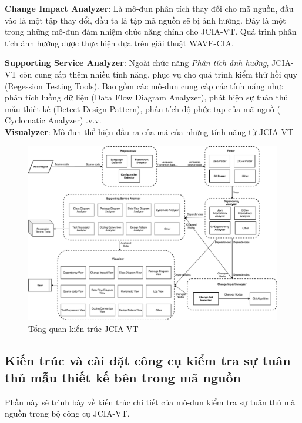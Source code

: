 \documentclass[12pt]{report}
\begin{document}
\noindent \textbf{Change Impact Analyzer}: Là mô-đun phân tích thay đổi cho mã nguồn, đầu vào là một tập thay đổi, đầu ta là tập mã nguồn sẽ bị ảnh hưởng. Đây là một trong những mô-đun đảm nhiệm chức năng chính cho JCIA-VT. Quá trình phân tích ảnh hưởng được thực hiện dựa trên giải thuật WAVE-CIA.

\noindent \textbf{Supporting Service Analyzer}: Ngoài chức năng \textit{Phân tích ảnh hưởng}, JCIA-VT còn cung cấp thêm nhiều tính năng, phục vụ cho quá trình kiểm thử hồi quy (Regession Testing Tools). Bao gồm các mô-đun cung cấp các tính năng như: phân tích luồng dữ liệu (Data Flow Diagram Analyzer), phát hiện sự tuân thủ mẫu thiết kế (Detect Design Pattern), phân tích độ phức tạp của mã nguồ ( Cyclomatic Analyzer) .v.v.\\
\textbf{Visualyzer}: Mô-đun thể hiện đầu ra của mã của những tính năng từ JCIA-VT 
\begin{figure}[h]
	\centering
	\includegraphics[scale=0.2]{images/architexture}
	\caption{Tổng quan kiến trúc JCIA-VT}
	\label{fig:architexture}
\end{figure}
\subsection{Kiến trúc và cài đặt công cụ kiểm tra sự tuân thủ mẫu thiết kế bên trong mã nguồn}
Phần này sẽ trình bày về kiến trúc chi tiết của mô-đun kiểm tra sự tuân thủ mã nguồn trong bộ công cụ JCIA-VT.
\end{document}
